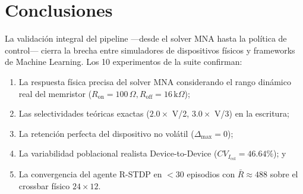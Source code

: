 \documentclass[12pt,a4paper]{article}
\begin{document}
\section{Conclusiones}
La validación integral del pipeline ---desde el solver MNA hasta la política de control--- cierra la brecha entre simuladores de dispositivos físicos y frameworks de Machine Learning. Los 10 experimentos de la suite confirman:
\begin{enumerate}
    \item La respuesta física precisa del solver MNA considerando el rango dinámico real del memristor ($R_{\text{on}} = 100\,\Omega, R_{\text{off}} = 16\,\text{k}\Omega$);
    \item Las selectividades teóricas exactas ($2.0\times$ V/2, $3.0\times$ V/3) en la escritura;
    \item La retención perfecta del dispositivo no volátil ($\Delta_{\max} = 0$);
    \item La variabilidad poblacional realista Device-to-Device ($CV_{I_{\text{col}}} = 46.64\%$); y
    \item La convergencia del agente R-STDP en $<30$ episodios con $\bar{R} \approx 488$ sobre el crossbar físico $24 \times 12$.
\end{enumerate}
\end{document}
